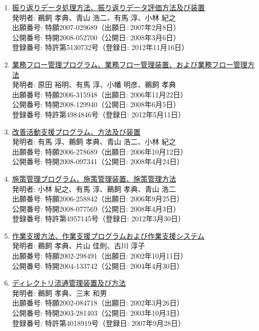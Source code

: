 \documentclass[dvipdfmx]{jlreq}
\begin{document}
\begin{enumerate}[label=\arabic*,align=parleft]
\begin{enumerate}
\item \href{https://jglobal.jst.go.jp/detail?JGLOBAL_ID=201303059562067089}{振り返りデータ処理方法、振り返りデータ評価方法及び装置}\\発明者: 鵜飼 孝典、青山 浩二、有馬 淳、小林 紀之\\出願番号: 特願2007-029689（出願日: 2007年2月8日）\\公開番号: 特開2008-052700（公開日: 2008年3月6日）\\登録番号: 特許第5130732号（登録日: 2012年11月16日）
\item \href{https://jglobal.jst.go.jp/detail?JGLOBAL_ID=201303042662850724}{業務フロー管理プログラム、業務フロー管理装置、および業務フロー管理方法}\\発明者: 原田 裕明、有馬 淳、小幡 明彦、鵜飼 孝典\\出願番号: 特願2006-315948（出願日: 2006年11月22日）\\公開番号: 特開2008-129940（公開日: 2008年6月5日）\\登録番号: 特許第4984846号（登録日: 2012年5月11日）
\item \href{https://jglobal.jst.go.jp/detail?JGLOBAL_ID=200903011907305420}{改善活動支援プログラム、方法及び装置}\\発明者: 有馬 淳、鵜飼 孝典、青山 浩二、小林 紀之\\出願番号: 特願2006-278689（出願日: 2006年10月12日）\\公開番号: 特開2008-097341（公開日: 2008年4月24日）
\item \href{https://jglobal.jst.go.jp/detail?JGLOBAL_ID=201303048278580793}{施策管理プログラム、施策管理装置、施策管理方法}\\発明者: 小林 紀之、有馬 淳、鵜飼 孝典、青山 浩二\\出願番号: 特願2006-258842（出願日: 2006年9月25日）\\公開番号: 特開2008-077569（公開日: 2008年4月3日）\\登録番号: 特許第4957145号（登録日: 2012年3月30日）
\item \href{https://jglobal.jst.go.jp/detail?JGLOBAL_ID=200903072805036270}{作業支援方法、作業支援プログラムおよび作業支援システム}\\発明者: 鵜飼 孝典、片山 佳則、古川 淳子\\出願番号: 特願2002-298491（出願日: 2002年10月11日）\\公開番号: 特開2004-133742（公開日: 2004年4月30日）
\item \href{https://jglobal.jst.go.jp/detail?JGLOBAL_ID=201103066999054603}{ディレクトリ流通管理装置及び方法}\\発明者: 鵜飼 孝典、三末 和男\\出願番号: 特願2002-084718（出願日: 2002年3月26日）\\公開番号: 特開2003-281403（公開日: 2003年10月3日）\\登録番号: 特許第4018919号（登録日: 2007年9月28日）

\end{enumerate}
\end{enumerate}
\end{document}
